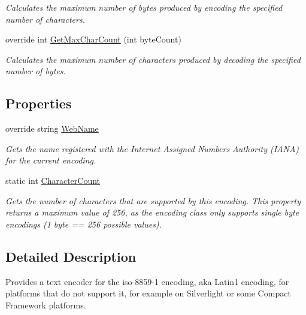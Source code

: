 \begin{DoxyCompactItemize}
\begin{DoxyCompactList}\small\item\em Calculates the maximum number of bytes produced by encoding the specified number of characters. \end{DoxyCompactList}\item 
override int \mbox{\hyperlink{class_super_tiled2_unity_1_1_ionic_1_1_encoding_1_1_iso8859_dash1_encoding_ab9df6fb251aa8d4cbc095169973d88f9}{Get\+Max\+Char\+Count}} (int byte\+Count)
\begin{DoxyCompactList}\small\item\em Calculates the maximum number of characters produced by decoding the specified number of bytes. \end{DoxyCompactList}\end{DoxyCompactItemize}
\subsection*{Properties}
\begin{DoxyCompactItemize}
\item 
override string \mbox{\hyperlink{class_super_tiled2_unity_1_1_ionic_1_1_encoding_1_1_iso8859_dash1_encoding_a318d765b9a1206a73efdd8faf64d52b5}{Web\+Name}}
\begin{DoxyCompactList}\small\item\em Gets the name registered with the Internet Assigned Numbers Authority (I\+A\+NA) for the current encoding. \end{DoxyCompactList}\item 
static int \mbox{\hyperlink{class_super_tiled2_unity_1_1_ionic_1_1_encoding_1_1_iso8859_dash1_encoding_a581a910dc2e39b13f88d000d57672c15}{Character\+Count}}
\begin{DoxyCompactList}\small\item\em Gets the number of characters that are supported by this encoding. This property returns a maximum value of 256, as the encoding class only supports single byte encodings (1 byte == 256 possible values). \end{DoxyCompactList}\end{DoxyCompactItemize}


\subsection{Detailed Description}
Provides a text encoder for the iso-\/8859-\/1 encoding, aka Latin1 encoding, for platforms that do not support it, for example on Silverlight or some Compact Framework platforms. 



